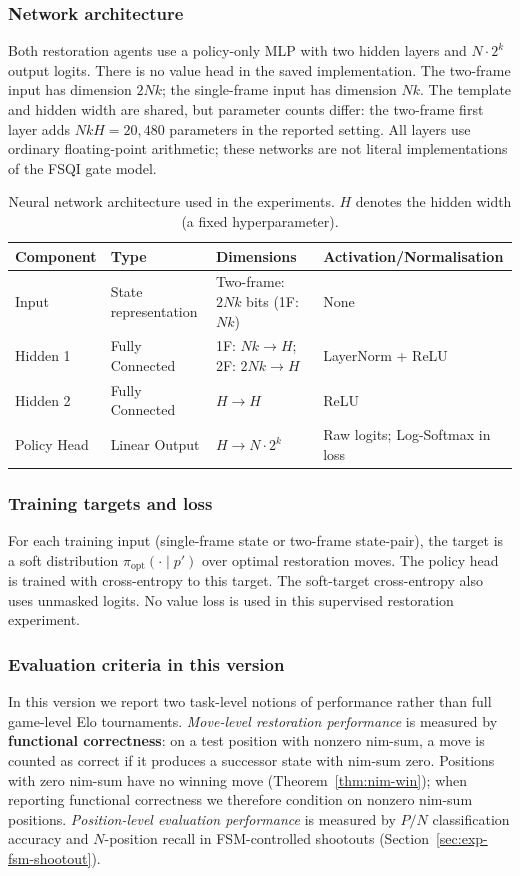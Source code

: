 \documentclass[twoside,11pt]{article}
\numberwithin{theorem}{section}
\numberwithin{equation}{section}
\begin{document}
\subsubsection{Network architecture}
Both restoration agents use a policy-only MLP with two hidden layers and $N\cdot2^k$ output logits. There is no value head in the saved implementation. The two-frame input has dimension $2Nk$; the single-frame input has dimension $Nk$. The template and hidden width are shared, but parameter counts differ: the two-frame first layer adds $NkH=20{,}480$ parameters in the reported setting. All layers use ordinary floating-point arithmetic; these networks are not literal implementations of the FSQI gate model.

\begin{table}[h!]
\centering
{\footnotesize
\begin{tabularx}{\linewidth}{@{}lYYY@{}}
\hline
\textbf{Component} & \textbf{Type} & \textbf{Dimensions} & \textbf{Activation/}\allowbreak\textbf{Normalisation} \\
\hline
Input & State representation & Two-frame: $2Nk$ bits (1F: $Nk$) & None \\
Hidden 1 & Fully Connected & 1F: $Nk\to H$; 2F: $2Nk\to H$ & LayerNorm + ReLU \\
Hidden 2 & Fully Connected & $H\to H$ & ReLU \\
Policy Head & Linear Output & $H\to N\cdot2^k$ & Raw logits; Log-Softmax in loss \\
\hline
\end{tabularx}}
\caption{Neural network architecture used in the experiments. $H$ denotes the hidden width (a fixed hyperparameter).}
\label{table:arch}
\end{table}

\subsubsection{Training targets and loss}
For each training input (single-frame state or two-frame state-pair), the target is a soft distribution $\pi_{\mathrm{opt}}(\cdot\mid p')$ over optimal restoration moves.
The policy head is trained with cross-entropy to this target.
The soft-target cross-entropy also uses unmasked logits. No value loss is used in this supervised restoration experiment.

\subsubsection{Evaluation criteria in this version}
In this version we report two task-level notions of performance rather than full game-level Elo tournaments.
\emph{Move-level restoration performance} is measured by \textbf{functional correctness}: on a test position with nonzero nim-sum, a move is counted as correct if it produces a successor state with nim-sum zero.
Positions with zero nim-sum have no winning move (Theorem~\ref{thm:nim-win}); when reporting functional correctness we therefore condition on nonzero nim-sum positions.
\emph{Position-level evaluation performance} is measured by $P/N$ classification accuracy and $N$-position recall in FSM-controlled shootouts (Section~\ref{sec:exp-fsm-shootout}).
\end{document}
